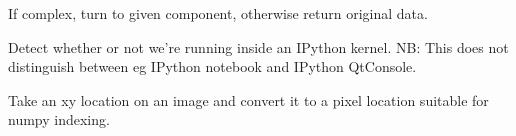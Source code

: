 \documentclass[letterpaper,10pt,english]{sphinxmanual}
\begin{document}

\begin{fulllineitems}
\label{\detokenize{xanespy:xanespy.utilities.get_component}}
If complex, turn to given component, otherwise return original data.

\end{fulllineitems}


\begin{fulllineitems}
\label{\detokenize{xanespy:xanespy.utilities.is_kernel}}
Detect whether or not we're running inside an IPython kernel. NB:
This does not distinguish between eg IPython notebook and IPython
QtConsole.

\end{fulllineitems}


\begin{fulllineitems}
\label{\detokenize{xanespy:xanespy.utilities.parallel_map}}
\end{fulllineitems}


\begin{fulllineitems}
\label{\detokenize{xanespy:xanespy.utilities.pixel_to_xy}}
Take an xy location on an image and convert it to a pixel location
suitable for numpy indexing.

\end{fulllineitems}

\end{document}
